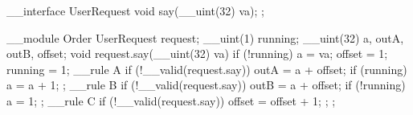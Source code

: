 \begin{codeblock}
__interface UserRequest {
    void say(__uint(32) va);
};

__module Order {
    UserRequest                     request;
    __uint(1) running;
    __uint(32) a, outA, outB, offset;
    void request.say(__uint(32) va) if (!running) {
        a = va;
        offset = 1;
        running = 1;
    }
    __rule A if (!__valid(request.say)) {
        outA = a + offset;
        if (running)
            a = a + 1;
    };
    __rule B if (!__valid(request.say)) {
        outB = a + offset;
        if (!running)
            a = 1;
    };
    __rule C if (!__valid(request.say)) {
        offset = offset + 1;
    };
};
\end{codeblock}
